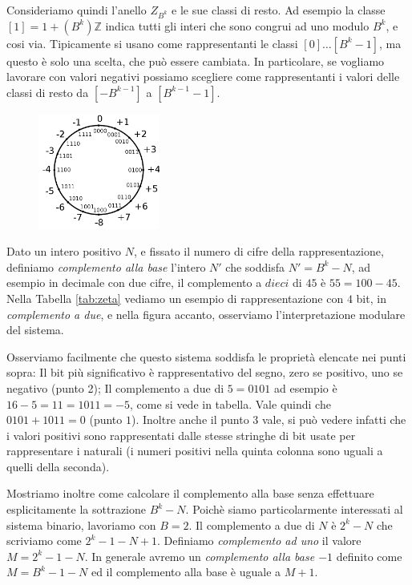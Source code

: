 Consideriamo quindi l'anello $Z_{B^k}$ e le sue classi di resto. Ad esempio la
classe $[1] = 1 + (B^k)\mathbb{Z}$ indica tutti gli interi che sono congrui ad
uno modulo $B^k$, e cosi via. Tipicamente si usano come rappresentanti le classi $[0] \ldots [B^k-1]$, ma questo è solo una scelta, che può
essere cambiata. In particolare, se vogliamo lavorare con valori negativi
possiamo scegliere come rappresentanti i valori delle classi di resto da $[-B^{k-1}]$ a $[B^{k-1}-1]$.

\begin{figure}\vspace{-3ex}
 \includegraphics[width=4cm]{2Komplement.png}
 \label{fig:comp2}
\end{figure}

Dato un intero positivo $N$, e fissato il numero di cifre della
rappresentazione, definiamo \emph{complemento alla base} l'intero $N'$ che
soddisfa $N'= B^k-N$, ad esempio in decimale con due cifre, il complemento a
$dieci$ di $45$ è $55 = 100-45$. Nella Tabella \ref{tab:zeta} vediamo un
esempio di rappresentazione con $4$ bit, in \emph{complemento a due}, e nella figura accanto, osserviamo l'interpretazione modulare del sistema.

Osserviamo facilmente che questo sistema soddisfa le proprietà elencate nei
punti sopra: Il bit più significativo è rappresentativo del segno, zero se
positivo, uno se negativo (punto 2); Il complemento a due di $5 = 0101$ ad
esempio è $16-5 = 11 = 1011 = -5$, come si vede in tabella. Vale quindi che
$0101+1011 = 0$ (punto $1$). Inoltre anche il punto $3$ vale, si può vedere
infatti che i valori positivi sono rappresentati dalle stesse stringhe di bit
usate per rappresentare i naturali (i numeri positivi nella quinta colonna sono
uguali a quelli della seconda).

Mostriamo inoltre come calcolare il complemento alla base senza effettuare
esplicitamente la sottrazione $B^k - N$. Poichè siamo particolarmente
interessati al sistema binario, lavoriamo con $B=2$.  
Il complemento a due di $N$ è $2^k - N$ che scriviamo come $2^k-1-N+1$. Definiamo \emph{complemento ad uno} il valore $M = 2^k-1-N$. In generale avremo un \emph{complemento alla base $-1$} definito come $M = B^k-1-N$ ed il complemento alla base è uguale a $M+1$. 

